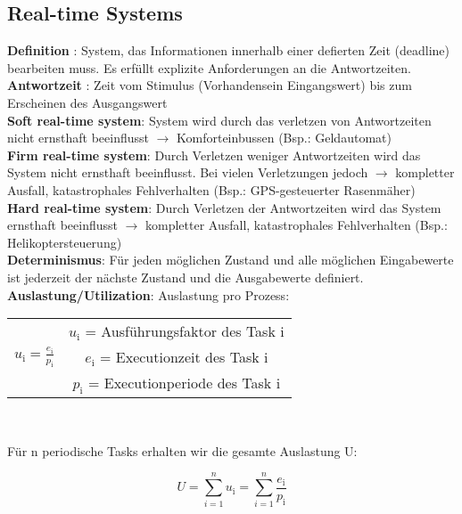 \subsection{Real-time Systems}
\textbf{Definition} : System, das Informationen innerhalb einer defierten Zeit
(deadline) bearbeiten muss. Es erfüllt explizite Anforderungen an die
Antwortzeiten.\\
\textbf{Antwortzeit} : Zeit vom Stimulus (Vorhandensein
Eingangswert) bis zum Erscheinen des Ausgangswert\\
\textbf{Soft real-time system}: System wird durch das verletzen von
Antwortzeiten nicht ernsthaft beeinflusst $\rightarrow$ Komforteinbussen (Bsp.:
Geldautomat)\\
\textbf{Firm real-time system}: Durch Verletzen weniger Antwortzeiten wird das
System nicht ernsthaft beeinflusst. Bei vielen Verletzungen jedoch $\rightarrow$
kompletter Ausfall, katastrophales Fehlverhalten (Bsp.: GPS-gesteuerter
Rasenmäher)\\
\textbf{Hard real-time system}: Durch Verletzen der Antwortzeiten wird das
System ernsthaft beeinflusst $\rightarrow$ kompletter Ausfall, katastrophales
Fehlverhalten (Bsp.: Helikoptersteuerung)\\
\textbf{Determinismus}: Für jeden möglichen Zustand und alle möglichen
Eingabewerte ist jederzeit der nächste Zustand und die Ausgabewerte definiert.\\
\textbf{Auslastung/Utilization}: 
Auslastung pro Prozess:
\begin{center}  
\begin{tabular}{c c}
& $u_\text{i}$ = Ausführungsfaktor des Task i\\
$u_\text{i} = \frac{e_\text{i}}{p_\text{i}}$&$e_\text{i}$ = Executionzeit des
Task i\\
& $p_\text{i}$ = Executionperiode des Task i
\end{tabular}\\
\end{center}
Für n periodische Tasks erhalten wir die gesamte Auslastung U: 
\begin{center}
\begin{equation}
U = \sum_{i=1}^{n}u_\text{i} = \sum_{i=1}^{n}\frac{e_\text{i}}{p_\text{i}}
\end{equation}
\end{center}

